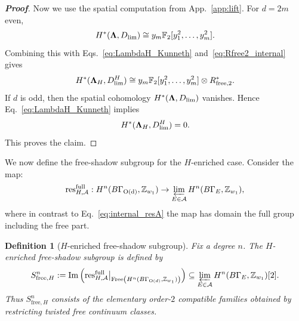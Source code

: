 \documentclass[aps,prx,reprint,superscriptaddress,twocolumn,amsmath,amssymb,amsfonts, nofootinbib]{revtex4-2}
\newcommand{\res}{\text{res}}
\newcommand{\Z}{\mathbb{Z}}
\theoremstyle{apsstyle}
\newtheorem{definition}[theorem]{Definition}
\begin{document}
\begin{proof}[\textnormal{\textbf{Proof}}]
\bigskip 

\noindent Now we use the spatial computation from App.~\ref{app:lift}. For $d=2m$ even,
\begin{equation}
H^{*}({\bf \Lambda},D_{\lim})
\cong
y_m\mathbb F_2[y_1^2,\dots,y_m^2].
\end{equation}
Combining this with Eqs.~\eqref{eq:LambdaH_Kunneth} and~\eqref{eq:Rfree2_internal} gives
\begin{equation}
H^{*}({\bf \Lambda}_{H},D_{\lim}^{H})
\cong
y_m\mathbb F_2[y_1^2,\dots,y_m^2]\otimes R_{\mathrm{free},2}^{*}.
\end{equation}
If $d$ is odd, then the spatial cohomology $H^{*}({\bf \Lambda},D_{\lim})$ vanishes. Hence Eq.~\eqref{eq:LambdaH_Kunneth} implies
\begin{equation}
H^{*}({\bf \Lambda}_{H},D_{\lim}^{H})=0.
\end{equation}
This proves the claim.
\end{proof}

\bigskip 

We now define the free-shadow subgroup for the $H$-enriched case. Consider the map:
\begin{equation}
\label{eq:res_full_H}
    \res_{H,\mathcal{A}}^{\mathrm{full}}: H^{n}(B\Gamma_{\mathrm{\mathrm{O}(d)}}, \Z_{w_{1}}) \to \varprojlim_{E\in \mathcal{A}} H^{n}(B\Gamma_{E}, \Z_{w_{1}}),
\end{equation}
where in contrast to Eq.~\ref{eq:internal_resA} the map has domain the full group including the free part. 

\begin{definition}[$H$-enriched free-shadow subgroup]
\label{def:Sfree_H}
Fix a degree $n$. The $H$-enriched free-shadow subgroup is defined by
\begin{equation}
S_{\mathrm{free},H}^{n}
:=
\operatorname{Im}
\left(
\res^{\mathrm{full}}_{H,\mathcal A}
\big\vert_{\mathrm{Free}\left(H^{n}(B\Gamma_{\mathrm{O}(d)},\mathbb Z_{w_1})\right)}
\right)
\subseteq
\varprojlim_{E\in\mathcal A}
H^{n}(B\Gamma_E,\mathbb Z_{w_1})[2].
\label{eq:def_Sfree_H}
\end{equation}
Thus $S_{\mathrm{free},H}^{n}$ consists of the elementary order-$2$ compatible families obtained by restricting twisted free continuum classes.
\end{definition}
\end{document}
